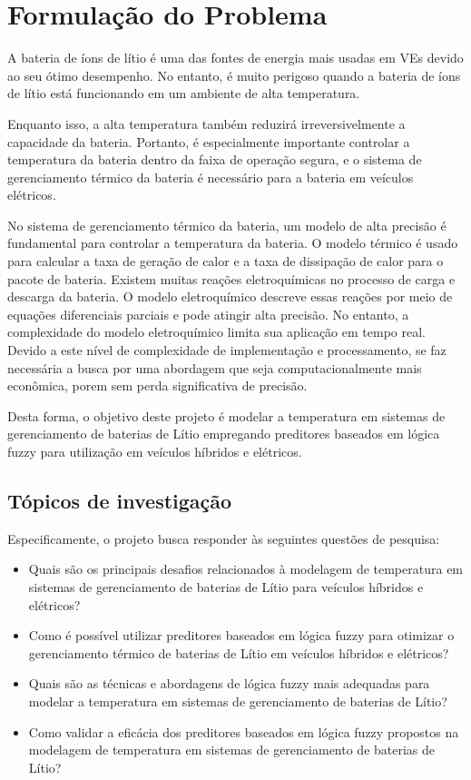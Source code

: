 \section{Formulação do Problema}

A bateria de íons de lítio é uma das fontes de energia mais usadas em VEs devido ao seu ótimo desempenho. No entanto, é muito perigoso quando a bateria de íons de lítio está funcionando em um ambiente de alta temperatura.

Enquanto isso, a alta temperatura também reduzirá irreversivelmente a capacidade da bateria. Portanto, é especialmente importante controlar a temperatura da bateria dentro da faixa de operação segura, e o sistema de gerenciamento térmico da bateria é necessário para a bateria em veículos elétricos.

No sistema de gerenciamento térmico da bateria, um modelo de alta precisão é fundamental para controlar a temperatura da bateria. O modelo térmico é usado para calcular a taxa de geração de calor e a taxa de dissipação de calor para o pacote de bateria. Existem muitas reações eletroquímicas no processo de carga e descarga da bateria. O modelo eletroquímico descreve essas reações por meio de equações diferenciais parciais e pode atingir alta precisão. No entanto, a complexidade do modelo eletroquímico limita sua aplicação em tempo real. Devido a este nível de complexidade de implementação e processamento, se faz necessária a busca por uma abordagem que seja computacionalmente mais econômica, porem sem perda significativa de precisão.

Desta forma, o objetivo deste projeto é modelar a temperatura em sistemas de gerenciamento de baterias de Lítio empregando preditores baseados em lógica fuzzy para utilização em veículos híbridos e elétricos.

\subsection{Tópicos de investigação}

Especificamente, o projeto busca responder às seguintes questões de pesquisa:
 
\begin{itemize}
\item  Quais são os principais desafios relacionados à modelagem de temperatura em sistemas de gerenciamento de baterias de Lítio para veículos híbridos e elétricos?
\item  Como é possível utilizar preditores baseados em lógica fuzzy para otimizar o gerenciamento térmico de baterias de Lítio em veículos híbridos e elétricos?
\item  Quais são as técnicas e abordagens de lógica fuzzy mais adequadas para modelar a temperatura em sistemas de gerenciamento de baterias de Lítio?
\item  Como validar a eficácia dos preditores baseados em lógica fuzzy propostos na modelagem de temperatura em sistemas de gerenciamento de baterias de Lítio?
\end{itemize}
